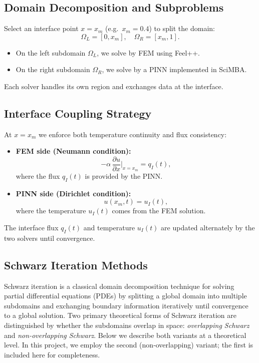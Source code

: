 \documentclass[12pt]{article}
\begin{document}
\subsection{Domain Decomposition and Subproblems}

Select an interface point \(x = x_m\) (e.g.\ \(x_m=0.4\)) to split the domain:
\[
  \Omega_L = [0,x_m], \quad \Omega_R = [x_m,1].
\]
\begin{itemize}
  \item On the left subdomain \(\Omega_L\), we solve by FEM using Feel++.
  \item On the right subdomain \(\Omega_R\), we solve by a PINN implemented in SciMBA.
\end{itemize}
Each solver handles its own region and exchanges data at the interface.

\subsection{Interface Coupling Strategy}

At \(x=x_m\) we enforce both temperature continuity and flux consistency\cite{quarteroni_domain_1999}:
\begin{itemize}
  \item \textbf{FEM side (Neumann condition):}
  \begin{equation}
    -\alpha\,\frac{\partial u}{\partial x}\Big|_{x=x_m}
    = q_I(t),
  \end{equation}
  where the flux \(q_I(t)\) is provided by the PINN.
  \item \textbf{PINN side (Dirichlet condition):}
  \begin{equation}
    u(x_m,t) = u_I(t),
  \end{equation}
  where the temperature \(u_I(t)\) comes from the FEM solution.
\end{itemize}
The interface flux \(q_I(t)\) and temperature \(u_I(t)\) are updated alternately by the two solvers until convergence.

\subsection{Schwarz Iteration Methods}

Schwarz iteration is a classical domain decomposition technique for solving partial differential equations (PDEs) by splitting a global domain into multiple subdomains and exchanging boundary information iteratively until convergence to a global solution. Two primary theoretical forms of Schwarz iteration are distinguished by whether the subdomains overlap in space: \emph{overlapping Schwarz} and \emph{non‐overlapping Schwarz}\cite{gander_schwarz_2008}. Below we describe both variants at a theoretical level. In this project, we employ the second (non‐overlapping) variant; the first is included here for completeness.
\end{document}
